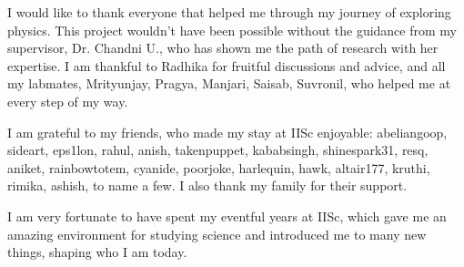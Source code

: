 \begin{acknowledgements}
	\hspace{40pt} I would like to thank everyone that helped me through my journey of exploring physics. This project wouldn't have been possible without the guidance from my supervisor, Dr. Chandni U., who has shown me the path of research with her expertise. I am thankful to  Radhika for fruitful discussions and advice, and all my labmates, Mrityunjay, Pragya, Manjari, Saisab, Suvronil, who helped me at every step of my way.
	
	I am grateful to my friends, who made my stay at IISc enjoyable: abeliangoop, sideart, eps1lon, rahul, anish, takenpuppet, kababsingh, shinespark31, resq, aniket, rainbowtotem, cyanide, poorjoke,  harlequin, hawk, altair177, kruthi, rimika, ashish, to name a few. I also thank my family for their support.
	
	I am very fortunate to have spent my eventful years at IISc, which gave me an amazing environment for studying science and introduced me to many new things, shaping who I am today.
\end{acknowledgements}